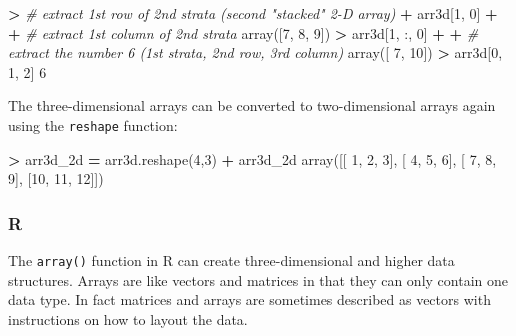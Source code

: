 \documentclass[
]{book}
\newenvironment{Shaded}{\begin{snugshade}}{\end{snugshade}}
\newcommand{\CommentTok}[1]{\textcolor[rgb]{0.56,0.35,0.01}{\textit{#1}}}
\newcommand{\DecValTok}[1]{\textcolor[rgb]{0.00,0.00,0.81}{#1}}
\newcommand{\NormalTok}[1]{#1}
\newcommand{\OperatorTok}[1]{\textcolor[rgb]{0.81,0.36,0.00}{\textbf{#1}}}
\begin{document}
\begin{Shaded}
\begin{Highlighting}[]
\OperatorTok{\textgreater{}} \CommentTok{\# extract 1st row of 2nd strata (second "stacked" 2{-}D array)}
\OperatorTok{+}\NormalTok{ arr3d[}\DecValTok{1}\NormalTok{, }\DecValTok{0}\NormalTok{]}
\OperatorTok{+} 
\OperatorTok{+} \CommentTok{\# extract 1st column of 2nd strata }
\NormalTok{array([}\DecValTok{7}\NormalTok{, }\DecValTok{8}\NormalTok{, }\DecValTok{9}\NormalTok{])}
\OperatorTok{\textgreater{}}\NormalTok{ arr3d[}\DecValTok{1}\NormalTok{, :, }\DecValTok{0}\NormalTok{]}
\OperatorTok{+} 
\OperatorTok{+} \CommentTok{\# extract the number 6 (1st strata, 2nd row, 3rd column)}
\NormalTok{array([ }\DecValTok{7}\NormalTok{, }\DecValTok{10}\NormalTok{])}
\OperatorTok{\textgreater{}}\NormalTok{ arr3d[}\DecValTok{0}\NormalTok{, }\DecValTok{1}\NormalTok{, }\DecValTok{2}\NormalTok{]}
\DecValTok{6}
\end{Highlighting}
\end{Shaded}

The three-dimensional arrays can be converted to two-dimensional arrays again using the \texttt{reshape} function:

\begin{Shaded}
\begin{Highlighting}[]
\OperatorTok{\textgreater{}}\NormalTok{ arr3d\_2d }\OperatorTok{=}\NormalTok{ arr3d.reshape(}\DecValTok{4}\NormalTok{,}\DecValTok{3}\NormalTok{)}
\OperatorTok{+}\NormalTok{ arr3d\_2d}
\NormalTok{array([[ }\DecValTok{1}\NormalTok{,  }\DecValTok{2}\NormalTok{,  }\DecValTok{3}\NormalTok{],}
\NormalTok{       [ }\DecValTok{4}\NormalTok{,  }\DecValTok{5}\NormalTok{,  }\DecValTok{6}\NormalTok{],}
\NormalTok{       [ }\DecValTok{7}\NormalTok{,  }\DecValTok{8}\NormalTok{,  }\DecValTok{9}\NormalTok{],}
\NormalTok{       [}\DecValTok{10}\NormalTok{, }\DecValTok{11}\NormalTok{, }\DecValTok{12}\NormalTok{]])}
\end{Highlighting}
\end{Shaded}

\hypertarget{r-10}{%
\subsubsection*{R}\label{r-10}}

The \texttt{array()} function in R can create three-dimensional and higher data structures. Arrays are like vectors and matrices in that they can only contain one data type. In fact matrices and arrays are sometimes described as vectors with instructions on how to layout the data.
\end{document}
